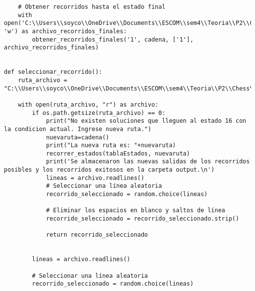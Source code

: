 \begin{lstlisting}
    # Obtener recorridos hasta el estado final
    with open('C:\\Users\\soyco\\OneDrive\\Documents\\ESCOM\\sem4\\Teoria\\P2\\Chess\\output\\recorridos_finales_blanca.txt', 'w') as archivo_recorridos_finales:
        obtener_recorridos_finales('1', cadena, ['1'], archivo_recorridos_finales)


def seleccionar_recorrido():
    ruta_archivo = "C:\\Users\\soyco\\OneDrive\\Documents\\ESCOM\\sem4\\Teoria\\P2\\Chess\\output\\recorridos_finales_blanca.txt"
    
    with open(ruta_archivo, "r") as archivo:
        if os.path.getsize(ruta_archivo) == 0:
            print("No existen soluciones que lleguen al estado 16 con la condicion actual. Ingrese nueva ruta.")
            nuevaruta=cadena()
            print("La nueva ruta es: "+nuevaruta)
            recorrer_estados(tablaEstados, nuevaruta)
            print('Se almacenaron las nuevas salidas de los recorridos posibles y los recorridos exitosos en la carpeta output.\n')
            lineas = archivo.readlines()
            # Seleccionar una línea aleatoria
            recorrido_seleccionado = random.choice(lineas)
            
            # Eliminar los espacios en blanco y saltos de línea
            recorrido_seleccionado = recorrido_seleccionado.strip()
            
            return recorrido_seleccionado
        
            
        lineas = archivo.readlines()
        
        # Seleccionar una línea aleatoria
        recorrido_seleccionado = random.choice(lineas)
        

\end{lstlisting}

